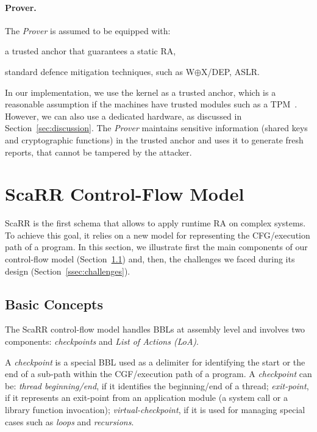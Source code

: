 \paragraph{Prover.}
The \emph{Prover} is assumed to be equipped with:
\begin{enumerate*}[label=(\roman*)]
	\item a trusted anchor that guarantees a static RA,
	\item standard defence mitigation techniques, such as W$\oplus$X/DEP, ASLR.
\end{enumerate*}
In our implementation, we use the kernel as a trusted anchor, which is a 
reasonable assumption if the machines have trusted modules such as a 
TPM~\cite{tomlinson2017introduction}. 
However, we can also use a dedicated hardware, as discussed in 
Section~\ref{sec:discussion}. The \emph{Prover} maintains sensitive information 
(\ie shared keys and cryptographic functions) in the trusted anchor and uses it 
to generate fresh reports, that cannot be tampered by the attacker. 

\section{ScaRR Control-Flow Model}
\label{sec:model}

ScaRR is the first schema that allows to apply runtime RA on complex systems. 
To achieve this goal, it relies on a new model for representing the 
CFG/execution path of a program. In this section, we illustrate first the main 
components of our control-flow model (Section~\ref{ssec:basic_concepts}) and, 
then, the challenges we faced during its design (Section~\ref{ssec:challenges}).

\subsection{Basic Concepts}
\label{ssec:basic_concepts}

The ScaRR control-flow model handles BBLs at assembly level and involves two 
components: \emph{checkpoints} and \emph{List of Actions (LoA)}.


A \emph{checkpoint} is a special BBL used as a delimiter for identifying the 
start or the end of a sub-path within the CGF/execution path of a program. A 
\emph{checkpoint} can be: \emph{thread beginning/end}, if it identifies the 
beginning/end of a thread; \emph{exit-point}, if it represents an exit-point 
from an application module (\eg a system call or a library function 
invocation); \emph{virtual-checkpoint}, if it is used for managing special 
cases such as \emph{loops} and \emph{recursions}. 

